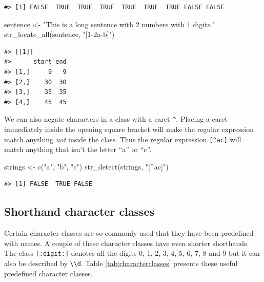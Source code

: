 \documentclass[
]{krantz}
\makeatletter
\newenvironment{Shaded}{\begin{snugshade}}{\end{snugshade}}
\newcommand{\FunctionTok}[1]{\textcolor[rgb]{0.00,0.00,0.00}{#1}}
\newcommand{\NormalTok}[1]{#1}
\newcommand{\OtherTok}[1]{\textcolor[rgb]{0.56,0.35,0.01}{#1}}
\newcommand{\StringTok}[1]{\textcolor[rgb]{0.31,0.60,0.02}{#1}}
\newenvironment{kframe}{%
\medskip{}
\setlength{\fboxsep}{.8em}
 \def\at@end@of@kframe{}%
 \ifinner\ifhmode%
  \def\at@end@of@kframe{\end{minipage}}%
  \begin{minipage}{\columnwidth}%
 \fi\fi%
 \def\FrameCommand##1{\hskip\@totalleftmargin \hskip-\fboxsep
 \colorbox{shadecolor}{##1}\hskip-\fboxsep
     \hskip-\linewidth \hskip-\@totalleftmargin \hskip\columnwidth}%
 \MakeFramed {\advance\hsize-\width
   \@totalleftmargin\z@ \linewidth\hsize
   \@setminipage}}%
 {\par\unskip\endMakeFramed%
 \at@end@of@kframe}
\renewenvironment{Shaded}{\begin{kframe}}{\end{kframe}}
\makeatother
\begin{document}
\begin{verbatim}
#> [1] FALSE  TRUE  TRUE  TRUE  TRUE  TRUE  TRUE FALSE FALSE
\end{verbatim}

\begin{Shaded}
\begin{Highlighting}[]
\NormalTok{sentence }\OtherTok{\textless{}{-}} \StringTok{"This is a long sentence with 2 numbers with 1 digits."}
\FunctionTok{str\_locate\_all}\NormalTok{(sentence, }\StringTok{"[1{-}2a{-}b]"}\NormalTok{)}
\end{Highlighting}
\end{Shaded}

\begin{verbatim}
#> [[1]]
#>      start end
#> [1,]     9   9
#> [2,]    30  30
#> [3,]    35  35
#> [4,]    45  45
\end{verbatim}

We can also negate characters in a class with a caret \texttt{\^{}}. Placing a caret immediately inside the opening square bracket will make the regular expression match anything \emph{not} inside the class. Thus the regular expression \texttt{{[}\^{}ac{]}} will match anything that isn't the letter ``a'' or ``c''.

\begin{Shaded}
\begin{Highlighting}[]
\NormalTok{strings }\OtherTok{\textless{}{-}} \FunctionTok{c}\NormalTok{(}\StringTok{"a"}\NormalTok{, }\StringTok{"b"}\NormalTok{, }\StringTok{"c"}\NormalTok{)}
\FunctionTok{str\_detect}\NormalTok{(strings, }\StringTok{"[\^{}ac]"}\NormalTok{)}
\end{Highlighting}
\end{Shaded}

\begin{verbatim}
#> [1] FALSE  TRUE FALSE
\end{verbatim}

\hypertarget{shorthand-character-classes}{%
\subsection{Shorthand character classes}\label{shorthand-character-classes}}

Certain character classes are so commonly used that they have been predefined with names. A couple of these character classes have even shorter shorthands. The class \texttt{{[}:digit:{]}} denotes all the digits 0, 1, 2, 3, 4, 5, 6, 7, 8 and 9 but it can also be described by \texttt{\textbackslash{}\textbackslash{}d}. Table \ref{tab:characterclasses} presents these useful predefined character classes.
\end{document}

